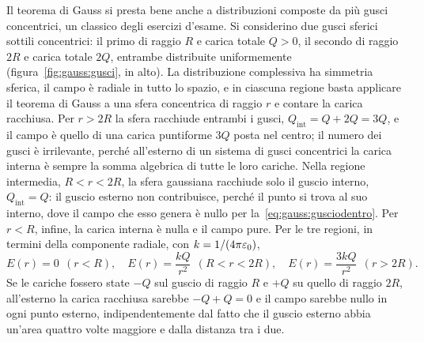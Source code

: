 \documentclass[11pt,a4paper]{article}
\begin{document}
Il teorema di Gauss si presta bene anche a distribuzioni composte da più gusci concentrici, un classico degli esercizi d'esame. Si considerino due gusci sferici sottili concentrici: il primo di raggio $R$ e carica totale $Q>0$, il secondo di raggio $2R$ e carica totale $2Q$, entrambe distribuite uniformemente (figura~\ref{fig:gauss:gusci}, in alto). La distribuzione complessiva ha simmetria sferica, il campo è radiale in tutto lo spazio, e in ciascuna regione basta applicare il teorema di Gauss a una sfera concentrica di raggio $r$ e contare la carica racchiusa. Per $r>2R$ la sfera racchiude entrambi i gusci, $Q_{\mathrm{int}}=Q+2Q=3Q$, e il campo è quello di una carica puntiforme $3Q$ posta nel centro; il numero dei gusci è irrilevante, perché all'esterno di un sistema di gusci concentrici la carica interna è sempre la somma algebrica di tutte le loro cariche. Nella regione intermedia, $R<r<2R$, la sfera gaussiana racchiude solo il guscio interno, $Q_{\mathrm{int}}=Q$: il guscio esterno non contribuisce, perché il punto si trova al suo interno, dove il campo che esso genera è nullo per la~\eqref{eq:gauss:gusciodentro}. Per $r<R$, infine, la carica interna è nulla e il campo pure. Per le tre regioni, in termini della componente radiale, con $k=1/(4\pi\varepsilon_0)$,
\[
E(r)=0\ \ (r<R),\quad E(r)=\frac{kQ}{r^2}\ \ (R<r<2R),\quad E(r)=\frac{3kQ}{r^2}\ \ (r>2R).
\]
Se le cariche fossero state $-Q$ sul guscio di raggio $R$ e $+Q$ su quello di raggio $2R$, all'esterno la carica racchiusa sarebbe $-Q+Q=0$ e il campo sarebbe nullo in ogni punto esterno, indipendentemente dal fatto che il guscio esterno abbia un'area quattro volte maggiore e dalla distanza tra i due.
\end{document}
